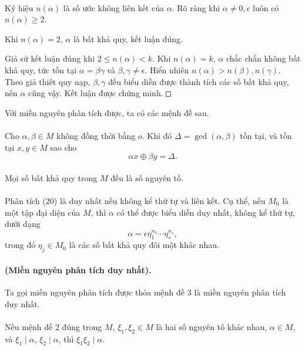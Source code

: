 \documentclass[11pt]{article}
\newcommand{\square}{\mathord{\vcenter{\hrule height .5pt
  \hbox{\vrule width .5pt height 5pt\kern5pt\vrule width .5pt}
  \hrule height .5pt}}}
\begin{document}
\paragraph{}
Ký hiệu \(n(\alpha)\) là số ước không liên kết của \(\alpha\). Rõ ràng khi
\(\alpha\ne0,\epsilon\) luôn có \(n(\alpha)\ge2\).

Khi \(n(\alpha)=2\), \(\alpha\) là bất khả quy, kết luận đúng.

Giả sử kết luận đúng khi \(2\le n(\alpha)<k\). Khi \(n(\alpha)=k\),
\(\alpha\) chắc chắn không bất khả quy, tức tồn tại \(\alpha=\beta\gamma\) và
\(\beta,\gamma\ne\epsilon\). Hiển nhiên \(n(\alpha)>n(\beta),n(\gamma)\). Theo
giả thiết quy nạp, \(\beta,\gamma\) đều biểu diễn được thành tích các số bất
khả quy, nên \(\alpha\) cũng vậy. Kết luận được chứng minh. \(\square\)

Với miền nguyên phân tích được, ta có các mệnh đề sau.

\paragraph{}
Cho \(\alpha,\beta\in M\) không đồng thời bằng \(o\). Khi đó
\(\Delta=\gcd(\alpha,\beta)\) tồn tại, và tồn tại \(x,y\in M\) sao cho
\[
  \alpha x\oplus\beta y=\Delta.
\]

\paragraph{}
Mọi số bất khả quy trong \(M\) đều là số nguyên tố.

\paragraph{}
Phân tích (20) là duy nhất nếu không kể thứ tự và liên kết. Cụ thể, nếu
\(M_0\) là một tập đại diện của \(M\), thì \(\alpha\) có thể được biểu diễn
duy nhất, không kể thứ tự, dưới dạng
\[
  \alpha=\epsilon\eta_1^{n_1}\cdots\eta_s^{n_s},
\]
trong đó \(\eta_j\in M_0\) là các số bất khả quy đôi một khác nhau.

\paragraph{ (Miền nguyên phân tích duy nhất).}
Ta gọi miền nguyên phân tích được thỏa mệnh đề 3 là miền nguyên phân tích duy
nhất.

\paragraph{}
Nếu mệnh đề 2 đúng trong \(M\), \(\xi_1,\xi_2\in M\) là hai số nguyên tố khác
nhau, \(\alpha\in M\), và \(\xi_1\mid\alpha\), \(\xi_2\mid\alpha\), thì
\(\xi_1\xi_2\mid\alpha\).
\end{document}
